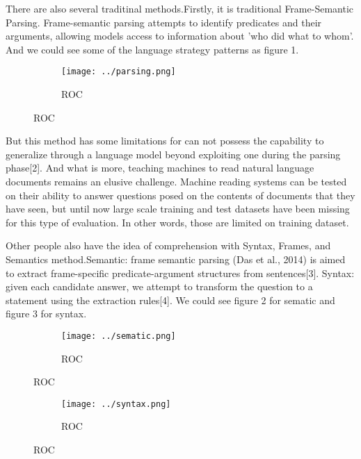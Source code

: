 \documentclass[runningheads,a4paper]{llncs}
\begin{document}
There are also several traditinal methods.Firstly, it is traditional Frame-Semantic Parsing. Frame-semantic parsing attempts to identify predicates and their arguments, allowing models access to information about 'who did what to whom'. And we could see some of the language strategy patterns as figure 1.

\begin{figure}[p]
	\centering
	\begin{subfigure}{.5\textwidth}
		\centering
		\texttt{[image: ../parsing.png]}
		\caption{ROC}
		\label{figure 1:Frame-Semantic Parsing}
	\end{subfigure}
	
\end{figure}

But this method has some limitations for can not possess the capability to generalize through a language model beyond exploiting one during the parsing phase[2]. And what is more, teaching machines to read natural language documents remains an elusive challenge. Machine reading systems can be tested on their ability to answer questions posed on the contents of documents that they have seen, but until now large scale training and test datasets have been missing for this type of evaluation. In other words, those are limited on training dataset.

Other people also have the idea of comprehension with Syntax, Frames, and Semantics method.Semantic: frame semantic parsing (Das et al., 2014) is aimed to extract frame-specific predicate-argument structures from sentences[3].
Syntax: given each candidate answer, we attempt to transform the question to a statement using the extraction rules[4]. We could see figure 2 for sematic and figure 3 for syntax.
\begin{figure}[p]
	\centering
	\begin{subfigure}{.5\textwidth}
		\centering
		\texttt{[image: ../sematic.png]}
		\caption{ROC}
		\label{figure 2:sematic parsing}
	\end{subfigure}
	
\end{figure}

\begin{figure}[p]
	\centering
	\begin{subfigure}{.5\textwidth}
		\centering
		\texttt{[image: ../syntax.png]}
		\caption{ROC}
		\label{figure 3:syntax}
	\end{subfigure}
	
\end{figure}
\end{document}
